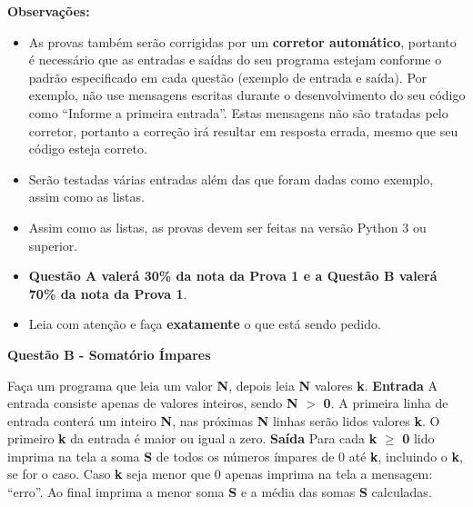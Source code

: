 \documentclass[a4paper, 12pt]{article}
\begin{document}
\textbf{{\large Observações:}}
\begin{itemize}
	\item As provas também serão corrigidas por um \textbf{corretor automático}, portanto é necessário que as entradas e saídas do seu programa estejam conforme o padrão especificado em cada questão (exemplo de entrada e saída). Por exemplo, não use mensagens escritas durante o desenvolvimento do seu código como “Informe a primeira entrada”. Estas mensagens não são tratadas pelo corretor, portanto a correção irá resultar em resposta errada, mesmo que seu código esteja correto.
	\item Serão testadas várias entradas além das que foram dadas como exemplo, assim como as listas.
	\item Assim como as listas, as provas devem ser feitas na versão Python 3 ou superior.
	\item \textbf{Questão A valerá 30\% da nota da Prova 1 e a Questão B valerá 70\% da nota da Prova 1}.
	\item Leia com atenção e faça \textbf{exatamente} o que está sendo pedido.
\end{itemize}
\newpage %
\begin{center}
\textbf{{\Large Questão B - Somatório Ímpares}}
\end{center}
\vspace{5pt}
Faça um programa que leia um valor \textbf{N}, depois leia \textbf{N} valores \textbf{k}.
\newline \newline
\textbf{{\large Entrada}} \newline
A entrada consiste apenas de valores inteiros, sendo \textbf{N} $>$ \textbf{0}. A primeira linha de entrada conterá um inteiro \textbf{N}, nas próximas \textbf{N} linhas serão lidos valores \textbf{k}. O primeiro \textbf{k} da entrada é maior ou igual a zero.
\newline \newline
\textbf{{\large Saída}} \newline
Para cada \textbf{k} $\geq$ \textbf{0} lido imprima na tela a soma \textbf{S} de todos os números ímpares de 0 até \textbf{k}, incluindo o \textbf{k}, se for o caso. Caso \textbf{k} seja menor que 0 apenas imprima na tela a mensagem: ``erro''. Ao final imprima a menor soma \textbf{S} e a média das somas \textbf{S} calculadas.
\newline
\end{document}
